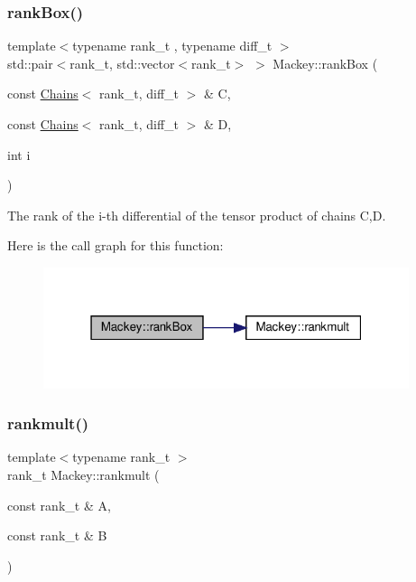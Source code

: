 \subsubsection{\texorpdfstring{rank\+Box()}{rankBox()}}
{\footnotesize\ttfamily template$<$typename rank\+\_\+t , typename diff\+\_\+t $>$ \\
std\+::pair$<$rank\+\_\+t, std\+::vector$<$rank\+\_\+t$>$ $>$ Mackey\+::rank\+Box (\begin{DoxyParamCaption}\item[{const \hyperlink{classMackey_1_1Chains}{Chains}$<$ rank\+\_\+t, diff\+\_\+t $>$ \&}]{C,  }\item[{const \hyperlink{classMackey_1_1Chains}{Chains}$<$ rank\+\_\+t, diff\+\_\+t $>$ \&}]{D,  }\item[{int}]{i }\end{DoxyParamCaption})}



The rank of the i-\/th differential of the tensor product of chains C,D. 

Here is the call graph for this function\+:\nopagebreak
\begin{figure}[H]
\begin{center}
\leavevmode
\includegraphics[width=304pt]{namespaceMackey_a1257ce64369e72438023fd4e261c7c83_cgraph}
\end{center}
\end{figure}
\mbox{\label{namespaceMackey_aaa0ce7673970bf261628768fb11a1995}} 
\subsubsection{\texorpdfstring{rankmult()}{rankmult()}}
{\footnotesize\ttfamily template$<$typename rank\+\_\+t $>$ \\
rank\+\_\+t Mackey\+::rankmult (\begin{DoxyParamCaption}\item[{const rank\+\_\+t \&}]{A,  }\item[{const rank\+\_\+t \&}]{B }\end{DoxyParamCaption})}



